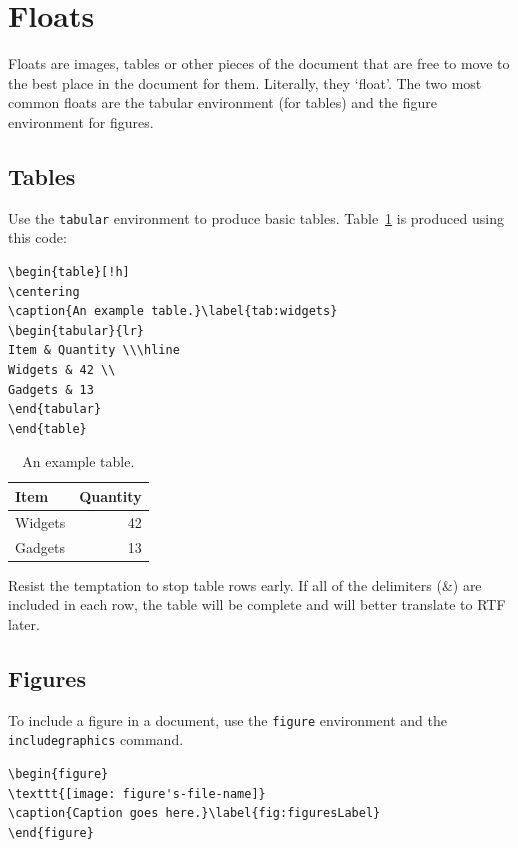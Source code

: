 \section{Floats}
Floats are images, tables or other pieces of the document that are free to move to the best place in the document for them. Literally, they `float'. The two most common floats are the tabular environment (for tables) and the figure environment for figures.

\subsection{Tables}
Use the \texttt{tabular} environment to produce basic tables. Table~\ref{tab:widgets} is produced using this code: 

\begin{verbatim}
\begin{table}[!h]
\centering
\caption{An example table.}\label{tab:widgets}
\begin{tabular}{lr}
Item & Quantity \\\hline
Widgets & 42 \\
Gadgets & 13
\end{tabular}
\end{table}
\end{verbatim}

\begin{table}[!h]
\centering
\caption{An example table.}\label{tab:widgets}
\begin{tabular}{lr}
Item & Quantity \\\hline
Widgets & 42 \\
Gadgets & 13
\end{tabular}
\end{table}

Resist the temptation to stop table rows early. If all of the delimiters  (\&) are included in each row, the table will be complete and will better translate to RTF later.

\subsection{Figures}
To include a figure in a document, use the \texttt{figure} environment and the \texttt{includegraphics} command.

\begin{verbatim}
\begin{figure}
\texttt{[image: figure's-file-name]}
\caption{Caption goes here.}\label{fig:figuresLabel}
\end{figure}
\end{verbatim}


